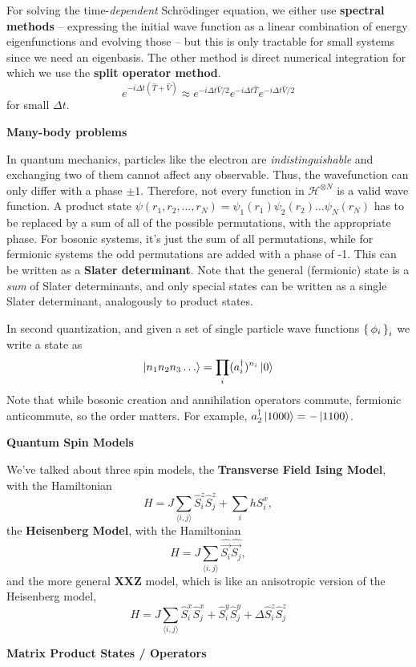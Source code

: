 \documentclass[10pt,landscape]{article}
\newcommand{\topiccolor}{green}
\newcommand{\topic}[2]{%
	\renewcommand{\topiccolor}{#1}
	\begin{tcolorbox}[boxsep=0.5mm, left=1mm, right=1mm, top=0mm, bottom=0mm,
		colback=#1!30, colframe=#1, arc is angular]%
		\centering \textbf{#2}%
	\end{tcolorbox}%
}
\newcommand{\cbf}[1]{\textcolor{\topiccolor!70!black}{\textbf{#1}}}
\begin{document}
\begin{multicols*}{3}
For solving the time-\emph{dependent} Schrödinger equation, we either use
\cbf{spectral methods} -- expressing the initial wave function as a linear combination
of energy eigenfunctions and evolving those -- but this is only tractable for
small systems since we need an eigenbasis. The other method is direct numerical
integration for which we use the \cbf{split operator method}.
\[
	e^{-i\Delta t(\hat T + \hat V)} \approx 
	e^{-i \Delta t \hat V / 2} e^{-i \Delta t \hat T} e^{-i \Delta t \hat V / 2}
\]
for small $\Delta t$.

\topic{green}{Many-body problems}

In quantum mechanics, particles like the electron are \emph{indistinguishable}
and exchanging two of them cannot affect any observable. Thus, the wavefunction
can only differ with a phase $\pm1$.
Therefore, not every function in $\mathcal H^{\otimes N}$ is a valid wave
function.
A product state 
$\psi(r_1, r_2, \ldots, r_N) = \psi_1(r_1) \psi_2(r_2) \ldots \psi_N(r_N)$
has to be replaced by a sum of all of the possible permutations, with the
appropriate phase. For bosonic systems, it's just the sum of all permutations,
while for fermionic systems the odd permutations are added with a phase of -1.
This can be written as a \cbf{Slater determinant}.
Note that the general (fermionic) state is a \emph{sum} of Slater determinants,
and only special states can be written as a single Slater determinant,
analogously to product states.

In second quantization, and given a set of single particle wave functions
$\set{\phi_i}_i$ we write a state as
\[
	\ket{n_1 n_2 n_3 \ldots} = \prod_i (a_i^\dagger)^{n_i} \ket 0
\]
Note that while bosonic creation and annihilation operators commute, fermionic
anticommute, so the order matters. For example, 
$a_2^\dagger\ket{1000} = -\ket{1100}$.

\topic{purple}{Quantum Spin Models}

We've talked about three spin models,
the \cbf{Transverse Field Ising Model}, with the Hamiltonian
\[
	H = J\sum_{\langle i,j \rangle} \hat S_i^z \hat S_j^z + \sum_i h S_i^x,
\]
the \cbf{Heisenberg Model}, with the Hamiltonian
\[
	H = J\sum_{\langle i,j \rangle} \hat{\vec{S_i}} \hat{\vec{S_j}},
\]
and the more general \cbf{XXZ} model, which is like an anisotropic version of
the Heisenberg model,
\[
	H = J\sum_{\langle i,j \rangle}  \hat S_i^x \hat S_j^x + \hat S_i^y \hat
	S_j^y + \Delta \hat S_i^z \hat S_j^z
\]


\topic{cyan}{Matrix Product States / Operators}


\end{multicols*}
\end{document}

